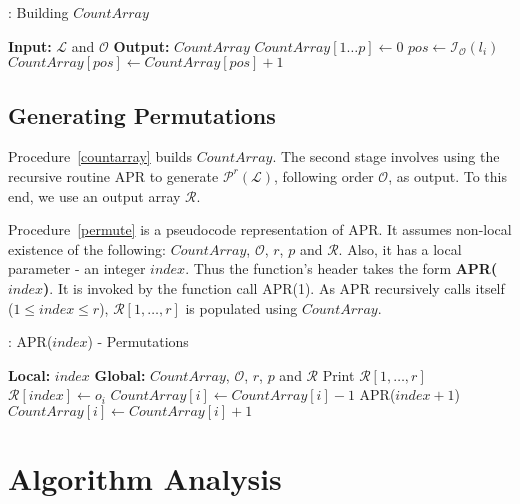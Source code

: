 \documentclass{article}
\begin{document}
\begin{algorithm}
\caption{: Building $CountArray$}
\label{countarray}
\begin{algorithmic}[1]
 \STATE \textbf{Input:} $\mathcal{L}$ and $\mathcal{O}$
 \STATE \textbf{Output:} $CountArray$
 \medskip
 \STATE $CountArray[1 \ldots p] \gets 0$
	\STATE $pos \gets \mathcal{I}_{\mathcal{O}}(l_i)$
	\STATE $CountArray[pos] \gets CountArray[pos] + 1$
 \ENDFOR
\end{algorithmic}
\end{algorithm}

\subsection{Generating Permutations}

Procedure~\ref{countarray} builds $CountArray$. The second stage involves using the recursive routine APR to generate $\mathcal{P}^r(\mathcal{L})$, following order $\mathcal{O}$, as output. To this end, we use an output array $\mathcal{R}$.

Procedure~\ref{permute} is a pseudocode representation of APR. It assumes non-local existence of the following: $CountArray$, $\mathcal{O}$, $r$, $p$ and $\mathcal{R}$. Also, it has a local parameter - an integer $index$. Thus the function's header takes the form \textbf{APR($index$)}. It is invoked by the function call APR(1). As APR recursively calls itself ($1 \le index \le r$), $\mathcal{R}[1, \ldots, r]$ is populated using $CountArray$.

\begin{algorithm}
\begin{algorithmic}[1]
\caption{: APR($index$) - Permutations}
\label{permute}
\STATE \textbf{Local:} $index$
\STATE \textbf{Global:} $CountArray$, $\mathcal{O}$, $r$, $p$ and $\mathcal{R}$
\medskip
{}
	\STATE Print $\mathcal{R}[1, \ldots, r]$
	\RETURN
\ELSE
		 \label{proc:apr:line:cond}
			\STATE $\mathcal{R}[index] \gets o_i$ 
			\STATE $CountArray[i] \gets CountArray[i] - 1$
			\STATE APR($index + 1$)
			\STATE $CountArray[i] \gets CountArray[i] + 1$
		\ENDIF
	\ENDFOR
\ENDIF
\end{algorithmic}
\end{algorithm}

\section{Algorithm Analysis}
\label{sec:anal}
\end{document}
